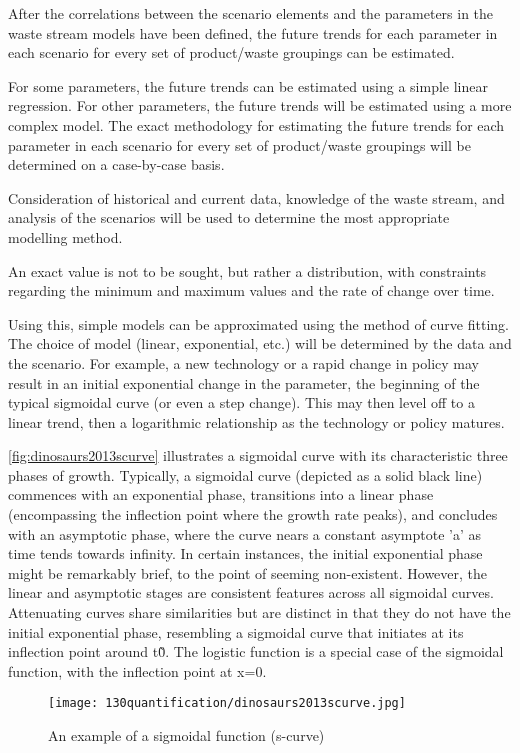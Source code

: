 After the correlations between the scenario elements and the parameters in the waste stream models have been defined, the future trends for each parameter in each scenario for every set of product/waste groupings can be estimated.

For some parameters, the future trends can be estimated using a simple linear regression. For other parameters, the future trends will be estimated using a more complex model. The exact methodology for estimating the future trends for each parameter in each scenario for every set of product/waste groupings will be determined on a case-by-case basis.

Consideration of historical and current data, knowledge of the waste stream, and analysis of the scenarios will be used to determine the most appropriate modelling method.

An exact value is not to be sought, but rather a distribution, with constraints regarding the minimum and maximum values and the rate of change over time.

Using this, simple models can be approximated using the method of curve fitting. The choice of model (linear, exponential, etc.) will be determined by the data and the scenario. For example, a new technology or a rapid change in policy may result in an initial exponential change in the parameter, the beginning of the typical sigmoidal curve (or even a step change). This may then level off to a linear trend, then a logarithmic relationship as the technology or policy matures.

\autoref{fig:dinosaurs2013scurve} illustrates a sigmoidal curve with its characteristic three phases of growth. Typically, a sigmoidal curve (depicted as a solid black line) commences with an exponential phase, transitions into a linear phase (encompassing the inflection point where the growth rate peaks), and concludes with an asymptotic phase, where the curve nears a constant asymptote 'a' as time tends towards infinity. In certain instances, the initial exponential phase might be remarkably brief, to the point of seeming non-existent. However, the linear and asymptotic stages are consistent features across all sigmoidal curves. Attenuating curves share similarities but are distinct in that they do not have the initial exponential phase, resembling a sigmoidal curve that initiates at its inflection point around t\~0. The logistic function is a special case of the sigmoidal function, with the inflection point at x=0.

\begin{figure}[h!]
  \centering
  \texttt{[image: 130quantification/dinosaurs2013scurve.jpg]}
  \caption{An example of a sigmoidal function (s-curve)}
  \label{fig:dinosaurs2013scurve}
\end{figure}

